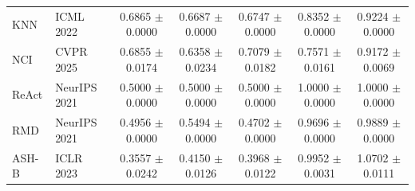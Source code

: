 \begin{table}[t]
{\begin{tabular}{llccccc}
KNN & ICML 2022 & 0.6865 $\pm$ 0.0000 & 0.6687 $\pm$ 0.0000 & 0.6747 $\pm$ 0.0000 & 0.8352 $\pm$ 0.0000 & 0.9224 $\pm$ 0.0000 \\
NCI & CVPR 2025 & 0.6855 $\pm$ 0.0174 & 0.6358 $\pm$ 0.0234 & 0.7079 $\pm$ 0.0182 & 0.7571 $\pm$ 0.0161 & 0.9172 $\pm$ 0.0069 \\
ReAct & NeurIPS 2021 & 0.5000 $\pm$ 0.0000 & 0.5000 $\pm$ 0.0000 & 0.5000 $\pm$ 0.0000 & 1.0000 $\pm$ 0.0000 & 1.0000 $\pm$ 0.0000 \\
RMD & NeurIPS 2021 & 0.4956 $\pm$ 0.0000 & 0.5494 $\pm$ 0.0000 & 0.4702 $\pm$ 0.0000 & 0.9696 $\pm$ 0.0000 & 0.9889 $\pm$ 0.0000 \\
ASH-B & ICLR 2023 & 0.3557 $\pm$ 0.0242 & 0.4150 $\pm$ 0.0126 & 0.3968 $\pm$ 0.0122 & 0.9952 $\pm$ 0.0031 & 1.0702 $\pm$ 0.0111 \\
\bottomrule
\end{tabular}%
}
\end{table}
